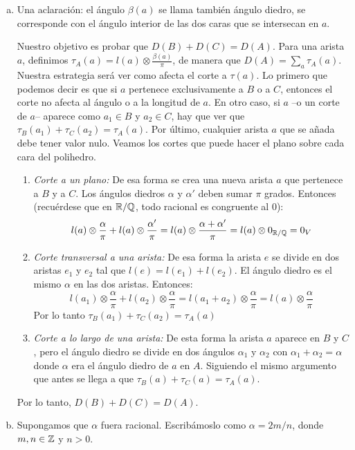 \documentclass[twoside]{article}
\begin{document}
\begin{solucion}
\begin{enumerate}[(a)]
\item Una aclaración: el ángulo $\beta(a)$ se llama también ángulo diedro, se corresponde con el ángulo interior de las dos caras que se intersecan en $a$.

Nuestro objetivo es probar que $D(B)+D(C) = D(A)$.
Para una arista $a$, definimos $\tau_A(a) = l(a) ⊗ \frac{\beta(a)}{\pi}$, de manera que $D(A) = \sum_a \tau_A(a)$.
Nuestra estrategia será ver como afecta el corte a $\tau(a)$.
Lo primero que podemos decir es que si $a$ pertenece exclusivamente a $B$ o a $C$, entonces el corte no afecta al ángulo o a la longitud de $a$.
En otro caso, si $a$ --o un corte de $a$-- aparece como $a_1 \in B$ y $a_2 \in C$, hay que ver que $\tau_B(a_1) + \tau_C(a_2) = \tau_A(a)$.
Por último, cualquier arista $a$ que se añada debe tener valor nulo.
Veamos los cortes que puede hacer el plano sobre cada cara del polihedro.
\begin{enumerate}
	\item \textit{Corte a un plano:} De esa forma se crea una nueva arista $a$ que pertenece a $B$ y a $C$. Los ángulos diedros $\alpha$ y $\alpha'$ deben sumar $\pi$ grados.
	Entonces (recuérdese que en $\mathbb{R}/\mathbb{Q}$, todo racional es congruente al $0$):
	\[ l(a)\otimes\frac{\alpha}{\pi} + l(a)\otimes\frac{\alpha'}{\pi} = l(a)\otimes\frac{\alpha+\alpha'}{\pi} = l(a) \otimes 0_{\mathbb{R}/\mathbb{Q}} = 0_V \]
	\item \textit{Corte transversal a una arista:} De esa forma la arista $e$ se divide en dos aristas $e_1$ y $e_2$ tal que $l(e)=l(e_1)+l(e_2)$.
	El ángulo diedro es el mismo $\alpha$ en las dos aristas. Entonces:
	\[ l(a_1)\otimes\frac{\alpha}{\pi} + l(a_2)\otimes\frac{\alpha}{\pi} = l(a_1 + a_2)\otimes\frac{\alpha}{\pi} = l(a)\otimes\frac{\alpha}{\pi} \]
	Por lo tanto $\tau_B(a_1) + \tau_C(a_2) = \tau_A(a)$
	\item \textit{Corte a lo largo de una arista:} De esta forma la arista $a$ aparece en $B$ y $C$, pero el ángulo diedro se divide en dos ángulos $\alpha_1$ y $\alpha_2$ con $\alpha_1+\alpha_2=\alpha$ donde $\alpha$ era el ángulo diedro de $a$ en $A$.
	Siguiendo el mismo argumento que antes se llega a que $\tau_B(a) + \tau_C(a) = \tau_A(a)$.
\end{enumerate}
Por lo tanto, $D(B)+D(C) = D(A)$.

\item Supongamos que $α$ fuera racional.
Escribámoslo como $α = 2m/n$, donde $m, n \in \mathbb{Z}$ y $n > 0$.


\end{enumerate}
\end{solucion}
\end{document}
